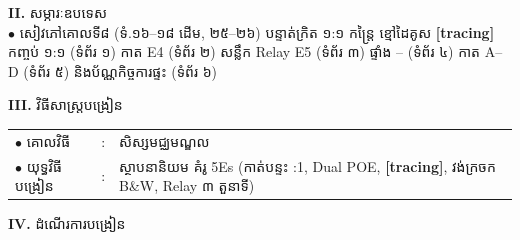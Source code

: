 \documentclass[a4paper,10pt]{article}
\newcommand{\en}[1]{{\TimesEn #1}}
\newcommand{\cnum}[1]{{\fontsize{10.5pt}{12pt}\selectfont\ding{\numexpr181+#1\relax}}\hspace{0.15em}}
\begin{document}
{\vspace{2pt}

\textbf{II.} {\muol សម្ភារៈឧបទេស}\\[1pt]
\hspace*{0.55cm}$\bullet$ \hspace{0.35cm} សៀវភៅគោលទី៨ (ទំ.១៦–១៨ ដើម, ២៥–២៦) បន្ទាត់ក្រិត ១:១ កន្ត្រៃ ខ្មៅដៃគូស \textbf{[tracing]} កញ្ចប់ ១:១ (ទំព័រ ១) កាត \en{E4} (ទំព័រ ២) សន្លឹក \en{Relay E5} (ទំព័រ ៣) ផ្ទាំង \cnum{1}--\cnum{5} (ទំព័រ ៤) កាត \en{A--D} (ទំព័រ ៥) និងប័ណ្ណកិច្ចការផ្ទះ (ទំព័រ ៦)

\vspace{2pt}

\textbf{III.} {\muol វិធីសាស្រ្តបង្រៀន}\\[1pt]
\hspace*{0.45cm}%
\begin{tabular}{@{}l l L{14.85cm}@{}}
  $\bullet$ \hspace{0.25cm} គោលវិធី & : & សិស្សមជ្ឈមណ្ឌល \\
  $\bullet$ \hspace{0.25cm} យុទ្ធវិធីបង្រៀន & : & ស្ថាបនានិយម គំរូ \en{5Es} (កាត់បន្ទះ \en{1:1}, \en{Dual POE}, \textbf{[tracing]}, វង់ក្រចក \en{B\&W}, \en{Relay} ៣ តួនាទី) \\
\end{tabular}
}

\vspace{2pt}

\textbf{IV.} {\muol ដំណើរការបង្រៀន}

\vspace{1pt}
\end{document}
